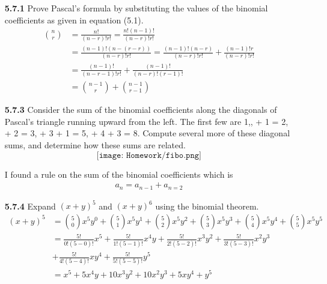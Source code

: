\documentclass[12pt]{article}
\begin{document}
\begin{enumerate}
    \item[\bf 5.7.1] Prove Pascal's formula by substituting the values of the binomial coefficients as given in equation (5.1).\\
    
    \begin{align*}
        \binom{n}{r} &= \frac{n!}{(n-r)!r!} = \frac{n!(n-1)!}{(n-r)!r!}\\
                     &= \frac{(n-1)!(n-(r-r))}{(n-r)!r!} = \frac{(n-1)!(n-r)}{(n-r)!r!} + \frac{(n-1)!r}{(n-r)!r!}\\
                     &= \frac{(n-1)!}{(n-r-1)!r!} + \frac{(n-1)!}{(n-r)!(r-1)!}\\
                     &= \binom{n-1}{r} + \binom{n-1}{r-1}
    \end{align*}

    
    \newpage
    \item[\bf 5.7.3] Consider the sum of the binomial coefficients along the diagonals of Pascal's triangle running upward from the left. The first few are 1,, + 1 = 2, + 2 = 3, + 3 + 1 = 5, + 4 + 3 = 8. Compute several more of these diagonal sums, and determine how these sums are related.\\
   
$$\texttt{[image: Homework/fibo.png]}$$

    
    I found a rule on the sum of the binomial coefficients which is 
    \begin{align}
    a_n=a_{n-1}+a_{n=2} \tag{for $n\ge 2$}
    \end{align}
    
    \vspace{1.5\baselineskip}
    \item[\bf 5.7.4] Expand $(x+y)^5$ and $(x+y)^6$ using the binomial theorem.\\
    \begin{align*}
        (x+y)^5 &= \binom{5}{0}x^5y^0+ \binom{5}{1}x^5y^1+ \binom{5}{2}x^5y^2+ \binom{5}{3}x^5y^3+ \binom{5}{4}x^5y^4+ \binom{5}{5}x^5y^5\\
                &= \frac{5!}{0!(5-0)!}x^5 + \frac{5!}{1!(5-1)!}x^4y + \frac{5!}{2!(5-2)!}x^3y^2 + \frac{5!}{3!(5-3)!}x^2y^3 \\
                &+ \frac{5!}{4!(5-4)!}xy^4 + \frac{5!}{5!(5-5)!}y^5\\
                &=x^5 + 5x^4y + 10x^3y^2 + 10x^2y^3 + 5xy^4 + y^5
    \end{align*}
    

\end{enumerate}
\end{document}
